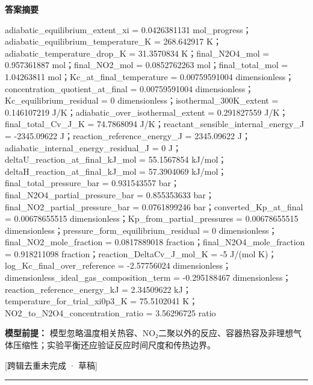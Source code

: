 \documentclass[UTF8,11pt,a4paper]{ctexart}
\begin{document}
\noindent\textbf{答案摘要}\par
adiabatic\_equilibrium\_extent\_xi = 0.0426381131 mol\_progress；adiabatic\_equilibrium\_temperature\_K = 268.642917 K；adiabatic\_temperature\_drop\_K = 31.3570834 K；final\_N2O4\_mol = 0.957361887 mol；final\_NO2\_mol = 0.0852762263 mol；final\_total\_mol = 1.04263811 mol；Kc\_at\_final\_temperature = 0.00759591004 dimensionless；concentration\_quotient\_at\_final = 0.00759591004 dimensionless；Kc\_equilibrium\_residual = 0 dimensionless；isothermal\_300K\_extent = 0.146107219 J/K；adiabatic\_over\_isothermal\_extent = 0.291827559 J/K；final\_total\_Cv\_J\_K = 74.7868094 J/K；reactant\_sensible\_internal\_energy\_J = -2345.09622 J；reaction\_reference\_energy\_J = 2345.09622 J；adiabatic\_internal\_energy\_residual\_J = 0 J；deltaU\_reaction\_at\_final\_kJ\_mol = 55.1567854 kJ/mol；deltaH\_reaction\_at\_final\_kJ\_mol = 57.3904069 kJ/mol；final\_total\_pressure\_bar = 0.931543557 bar；final\_N2O4\_partial\_pressure\_bar = 0.855353633 bar；final\_NO2\_partial\_pressure\_bar = 0.0761899246 bar；converted\_Kp\_at\_final = 0.00678655515 dimensionless；Kp\_from\_partial\_pressures = 0.00678655515 dimensionless；pressure\_form\_equilibrium\_residual = 0 dimensionless；final\_NO2\_mole\_fraction = 0.0817889018 fraction；final\_N2O4\_mole\_fraction = 0.918211098 fraction；reaction\_DeltaCv\_J\_mol\_K = -5 J/(mol K)；log\_Kc\_final\_over\_reference = -2.57756024 dimensionless；dimensionless\_ideal\_gas\_composition\_term = -0.295188467 dimensionless；reaction\_reference\_energy\_kJ = 2.34509622 kJ；temperature\_for\_trial\_xi0p3\_K = 75.5102041 K；NO2\_to\_N2O4\_concentration\_ratio = 3.56296725 ratio\par
\noindent\textbf{模型前提：}
模型忽略温度相关热容、NO₂二聚以外的反应、容器热容及非理想气体压缩性；实验平衡还应验证反应时间尺度和传热边界。\par
\noindent\textcolor{red!65!black}{[跨辑去重未完成 · 草稿]} \par
\medskip\hrule\medskip
{}
\end{document}
